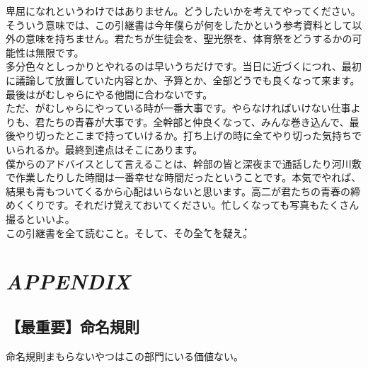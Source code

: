 \documentclass[dvipdfmx,jb5]{jreport}
\newcommand{\Chapter}[1]{\chapter{#1}\thispagestyle{fancy}}
\begin{document}
卑屈になれというわけではありません。どうしたいかを考えてやってください。そういう意味では、この引継書は今年僕らが何をしたかという参考資料として以外の意味を持ちません。君たちが生徒会を、聖光祭を、体育祭をどうするかの可能性は無限です。
\\

多分色々としっかりとやれるのは早いうちだけです。当日に近づくにつれ、最初に議論して放置していた内容とか、予算とか、全部どうでも良くなって来ます。最後はがむしゃらにやる他間に合わないです。
\\

ただ、がむしゃらにやっている時が一番大事です。やらなければいけない仕事よりも、君たちの青春が大事です。全幹部と仲良くなって、みんな巻き込んで、最後やり切ったとこまで持っていけるか。打ち上げの時に全てやり切った気持ちでいられるか。最終到達点はそこにあります。
\\

僕からのアドバイスとして言えることは、幹部の皆と深夜まで通話したり河川敷で作業したりした時間は一番幸せな時間だったということです。本気でやれば、結果も青もついてくるから心配はいらないと思います。高二が君たちの青春の締めくくりです。それだけ覚えておいてください。忙しくなっても写真もたくさん撮るといいよ。
\\

この引継書を全て読むこと。そして、\.そ\.の\.全\.て\.を\.疑\.え。
\Chapter{\textit{APPENDIX}}
\section{【最重要】命名規則}\label{sec:命名規則}
命名規則まもらないやつはこの部門にいる価値ない。
\end{document}
